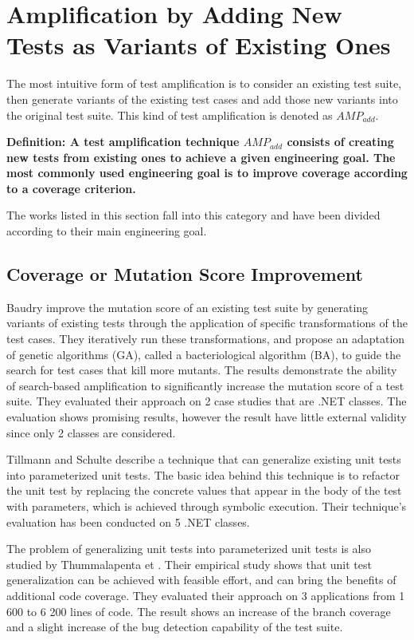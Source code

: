 \section{Amplification by Adding New Tests as Variants of Existing Ones}
\label{sec:sota:category-1}

The most intuitive form of test amplification is to consider an existing test suite, then generate variants of the existing test cases and add those new variants into the original test suite. 
This kind of test amplification is denoted as $AMP_{add}$.

\medskip
\textbf{Definition: A test amplification technique $AMP_{add}$ consists of creating new tests from existing ones to achieve a given engineering goal.
	The most commonly used engineering goal is to improve coverage according to a coverage criterion.}

The works listed in this section fall into this category and have been divided according to their main engineering goal.

\subsection{Coverage or Mutation Score Improvement}
\label{subsec:sota:category-1:coverage-vs-mutation}

Baudry \ie \cite{Baudry05a} \cite{Baudry05d} improve the mutation score of an existing test suite by generating variants of existing tests through the application of specific transformations of the test cases. 
They iteratively run these transformations, and propose an adaptation of genetic algorithms (GA), called a bacteriological algorithm (BA), to guide the search for test cases that kill more mutants.  
The results demonstrate the ability of search-based amplification to significantly increase the mutation score of a test suite.
They evaluated their approach on 2 case studies that are .NET classes.
The evaluation shows promising results, however the result have little external validity since only 2 classes are considered.

Tillmann and Schulte \cite{tillmann2006unit} describe a technique that can generalize existing unit tests into parameterized unit tests. 
The basic idea behind this technique is to refactor the unit test by replacing the concrete values that appear in the body of the test with parameters, which is achieved through symbolic execution. 
Their technique's evaluation has been conducted on 5 .NET classes.

The problem of generalizing unit tests into parameterized unit tests is also studied by Thummalapenta et \etal\cite{marri2010retrofitting}. 
Their empirical study shows that unit test generalization can be achieved with feasible effort, and can bring the benefits of additional code coverage.
They evaluated their approach on 3 applications from 1 600 to 6 200 lines of code. 
The result shows an increase of the branch coverage and a slight increase of the bug detection capability of the test suite.

